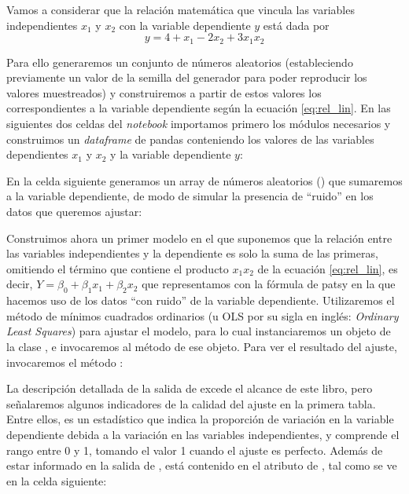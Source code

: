 Vamos a considerar que la relación matemática que vincula las variables independientes $x_1$ y $x_2$ con la variable dependiente $y$ está dada por 
\begin{equation} \label{eq:rel_lin}
y = 4 + x_1 - 2 x_2 + 3 x_1 x_2
 \end{equation}

Para ello generaremos un conjunto de números aleatorios (estableciendo previamente un valor de la semilla del generador para poder reproducir los valores muestreados) y construiremos a partir de estos valores los correspondientes a la variable dependiente según la ecuación \eqref{eq:rel_lin}. En las siguientes dos celdas del \textit{notebook} importamos primero los módulos necesarios y construimos un \textit{dataframe} de pandas conteniendo los valores de las variables dependientes $x_1$ y $x_2$ y la variable dependiente $y$:


En la celda siguiente generamos un array de números aleatorios () que sumaremos a la variable dependiente, de modo de simular la presencia de ``ruido'' en los datos que queremos ajustar:


Construimos ahora un primer modelo en el que suponemos que la relación entre las variables independientes y la dependiente es solo la suma de las primeras, omitiendo el término que contiene el producto $x_1 x_2$ de la ecuación \eqref{eq:rel_lin}, es decir, $Y = \beta_0 + \beta_1 x_1 + \beta_2 x_2$ que representamos con la fórmula de patsy  en la que hacemos uso de los datos ``con ruido'' de la variable dependiente. Utilizaremos el método de mínimos cuadrados ordinarios (u OLS por su sigla en inglés: \textit{Ordinary Least Squares}) para ajustar el modelo, para lo cual instanciaremos un objeto  de la clase , e invocaremos al método  de ese objeto. Para ver el resultado del ajuste, invocaremos el método :


La descripción detallada de la salida de  excede el alcance de este libro, pero señalaremos algunos indicadores de la calidad del ajuste en la primera tabla. Entre ellos,  es un estadístico que indica la proporción de variación en la variable dependiente debida a la variación en las variables independientes, y comprende el rango entre 0 y 1, tomando el valor 1 cuando el ajuste es perfecto. Además de estar informado en la salida de , está contenido en el atributo  de , tal como se ve en la celda siguiente:

